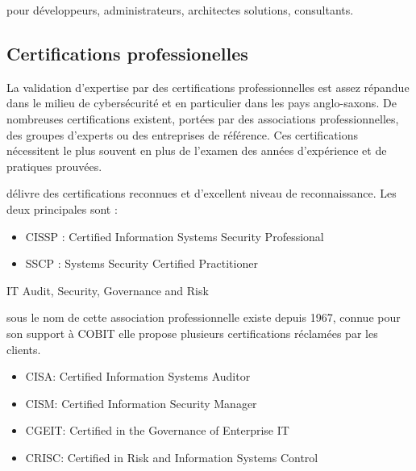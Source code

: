   

   pour  développeurs, administrateurs, architectes solutions, consultants.

\subsection{Certifications professionelles} 

La validation d'expertise par des certifications professionnelles est assez répandue dans le milieu de cybersécurité et en particulier dans les pays anglo-saxons. De nombreuses certifications existent, portées par des associations professionnelles, des groupes d'experts ou des entreprises de référence. Ces certifications nécessitent le plus souvent en plus de l'examen des années d'expérience et de pratiques prouvées.

   délivre des certifications reconnues et d'excellent niveau de reconnaissance.
Les deux principales sont :
\begin{itemize}
  \item CISSP : Certified Information Systems Security Professional
  \item SSCP : Systems Security Certified Practitioner
\end{itemize}


 IT Audit, Security, Governance and Risk 

sous le nom de  cette association professionnelle existe depuis 1967, connue pour son support à COBIT elle propose plusieurs certifications réclamées par les clients. 


\begin{itemize}
  \item CISA: Certified Information Systems Auditor
  \item CISM: Certified Information Security Manager
 \item CGEIT: Certified in the Governance of Enterprise IT
  \item CRISC: Certified in Risk and Information Systems Control
\end{itemize}

